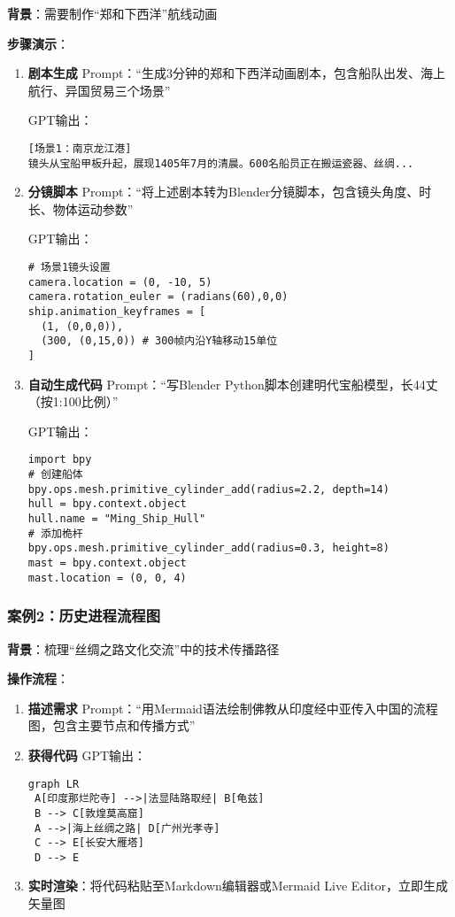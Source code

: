 \textbf{背景}：需要制作``郑和下西洋''航线动画

\textbf{步骤演示}：

\begin{enumerate}
\def\labelenumi{\arabic{enumi}.}
\item
  \textbf{剧本生成}
  Prompt：``生成3分钟的郑和下西洋动画剧本，包含船队出发、海上航行、异国贸易三个场景''

  GPT输出：

\begin{lstlisting}
[场景1：南京龙江港] 
镜头从宝船甲板升起，展现1405年7月的清晨。600名船员正在搬运瓷器、丝绸...
\end{lstlisting}
\item
  \textbf{分镜脚本}
  Prompt：``将上述剧本转为Blender分镜脚本，包含镜头角度、时长、物体运动参数''

  GPT输出：

\begin{lstlisting}
# 场景1镜头设置
camera.location = (0, -10, 5)
camera.rotation_euler = (radians(60),0,0)
ship.animation_keyframes = [
  (1, (0,0,0)), 
  (300, (0,15,0)) # 300帧内沿Y轴移动15单位
]
\end{lstlisting}
\item
  \textbf{自动生成代码} Prompt：``写Blender
  Python脚本创建明代宝船模型，长44丈（按1:100比例）''

  GPT输出：

\begin{lstlisting}
import bpy
# 创建船体
bpy.ops.mesh.primitive_cylinder_add(radius=2.2, depth=14)
hull = bpy.context.object
hull.name = "Ming_Ship_Hull"
# 添加桅杆
bpy.ops.mesh.primitive_cylinder_add(radius=0.3, height=8)
mast = bpy.context.object
mast.location = (0, 0, 4)
\end{lstlisting}
\end{enumerate}

\hypertarget{ux6848ux4f8b2ux5386ux53f2ux8fdbux7a0bux6d41ux7a0bux56fe}{%
\subsubsection{案例2：历史进程流程图}\label{ux6848ux4f8b2ux5386ux53f2ux8fdbux7a0bux6d41ux7a0bux56fe}}

\textbf{背景}：梳理``丝绸之路文化交流''中的技术传播路径

\textbf{操作流程}：

\begin{enumerate}
\def\labelenumi{\arabic{enumi}.}
\item
  \textbf{描述需求}
  Prompt：``用Mermaid语法绘制佛教从印度经中亚传入中国的流程图，包含主要节点和传播方式''
\item
  \textbf{获得代码} GPT输出：

\begin{verbatim}
graph LR
 A[印度那烂陀寺] -->|法显陆路取经| B[龟兹]
 B --> C[敦煌莫高窟]
 A -->|海上丝绸之路| D[广州光孝寺]
 C --> E[长安大雁塔]
 D --> E
\end{verbatim}
\item
  \textbf{实时渲染}：将代码粘贴至Markdown编辑器或Mermaid Live
  Editor，立即生成矢量图
\end{enumerate}

